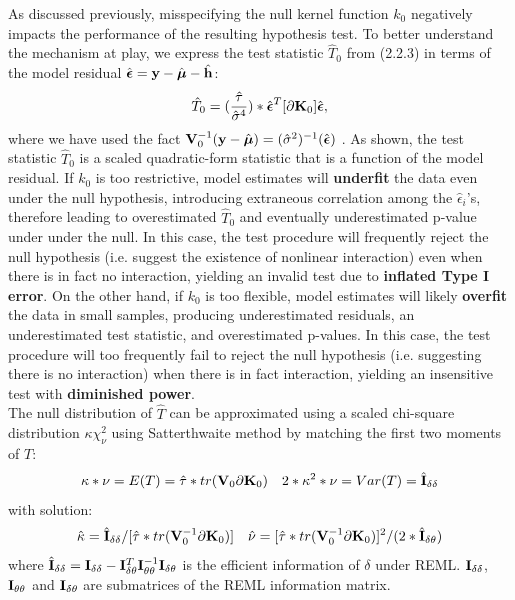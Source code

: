 \documentclass[11pt]{article}
\begin{document}
As discussed previously, misspecifying the null kernel function $k_0$ negatively impacts the performance of the resulting hypothesis test. To better understand the mechanism at play, we express the test statistic $\hat{T}_0$ from (2.2.3) in terms of the model residual $\hat{\boldsymbol{\epsilon}}={\bf y}-\hat{\boldsymbol{\mu}}-\hat{{\bf h}}$:
\begin{align}
\hat{T}_0=(\frac{\hat{\tau}}{\hat{\sigma}^4})*\hat{\boldsymbol{\epsilon}}^T[\partial {\bf K}_0]\hat{\boldsymbol{\epsilon}},
\end{align}
where we have used the fact ${\bf V}_0^{-1}({\bf y}-\hat{\boldsymbol{\mu}})=(\hat{\sigma}^2)^{-1}(\hat{\boldsymbol{\epsilon}})$ \citep{harville_maximum_1977}. As shown, the test statistic $\hat{T}_0$ is a scaled quadratic-form statistic that is a function of the model residual. If $k_0$ is too restrictive, model estimates will \textbf{underfit} the data even under the null hypothesis, introducing extraneous correlation among the $\hat{\epsilon}_i$'s, therefore leading to overestimated $\hat{T}_0$ and eventually underestimated p-value under under the null. In this case, the test procedure will frequently reject the null hypothesis (i.e. suggest the existence of nonlinear interaction) even when there is in fact no interaction, yielding an invalid test due to \textbf{inflated Type I error}. On the other hand, if $k_0$ is too flexible, model estimates will likely \textbf{overfit} the data in small samples, producing underestimated residuals, an underestimated test statistic, and overestimated p-values. In this case, the test procedure will too frequently fail to reject the null hypothesis (i.e. suggesting there is no interaction) when there is in fact interaction, yielding an insensitive test with \textbf{diminished power}.\\
The null distribution of $\hat{T}$ can be approximated using a scaled chi-square distribution $\kappa \chi_\nu^2$ using Satterthwaite method by matching the first two moments of $T$:
\begin{align*}
\kappa * \nu=E(T)=\hat{\tau} * tr({\bf V}_0\partial {\bf K}_0)
 \quad 2*\kappa^2*\nu=Var(T)=\hat{{\bf I}}_{\delta\delta}
\end{align*}
with solution:
\begin{align*}
\hat{\kappa}=\hat{{\bf I}}_{\delta\delta}/[\hat{\tau}*tr({\bf V}_0^{-1}\partial {\bf K}_0)] \quad \hat{\nu}=[\hat{\tau}*tr({\bf V}_0^{-1}\partial {\bf K}_0)]^2/(2*\hat{{\bf I}}_{\delta\theta})
\end{align*}
where $\hat{{\bf I}}_{\delta\delta}={\bf I}_{\delta\delta}-{\bf I}_{\delta\theta}^T{\bf I}_{\theta\theta}^{-1}{\bf I}_{\delta\theta}$ is the efficient information of $\delta$ under REML. ${\bf I}_{\delta\delta}$, ${\bf I}_{\theta\theta}$ and ${\bf I}_{\delta\theta}$ are submatrices of the REML information matrix. 
\end{document}
